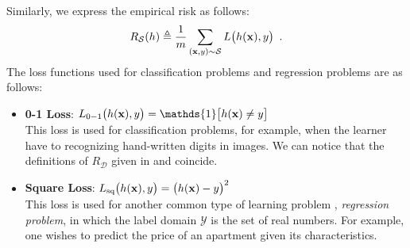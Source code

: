 Similarly, we express the empirical risk as follows:
\begin{equation}
  R_{\mathcal{S}}(h) \triangleq \frac{1}{m} \sum_{(\mathbf{x}, y) \sim \mathcal{S}} L\big( h(\mathbf{x}), y \big) \enspace.
\end{equation}
The loss functions used for classification problems and regression problems are as follows: 
\begin{itemize}
  \item \textbf{0-1 Loss}: $L_{0-1}\big( h(\xvec), y \big) = \mathds{1}\big[ h(\xvec) \neq y \big]$ \\
  This loss is used for classification problems, for example, when the learner have to recognizing hand-written digits in images.
  We can notice that the definitions of $R_{\mathcal{D}}$ given in  and  coincide.
  \item \textbf{Square Loss}: $L_{\text{sq}} \big( h(\mathbf{x}), y \big) = \big( h(\mathbf{x}) - y \big)^2$ \\	
  This loss is used for another common type of learning problem \ie, \emph{regression problem}, in which the label domain $\mathcal{Y}$ is the set of real numbers.
  For example, one wishes to predict the price of an apartment given its characteristics.
\end{itemize}


